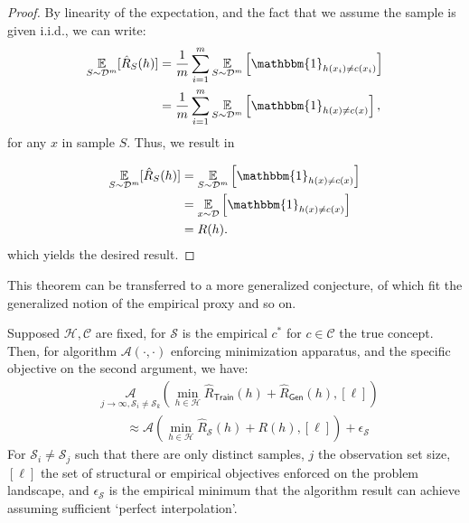 \begin{proof}
    By linearity of the expectation, and the fact that we assume the sample is given i.i.d., we can write: 
\begin{equation}
    \begin{split}
        \underset{S \sim \mathcal{D}^m}{\mathbb{E}}[\hat{R}_S(h)] 
        &= \frac{1}{m} \sum_{i=1}^m 
            \underset{S \sim \mathcal{D}^m}{\mathbb{E}} 
                    \left[ \mathbbm{1}_{h(x_i) \ne c(x_i)} \right] \\
        &= \frac{1}{m} \sum_{i=1}^m 
            \underset{S \sim \mathcal{D}^m}{\mathbb{E}} 
                \left[ \mathbbm{1}_{h(x) \ne c(x)} \right], \\
    \end{split}
\end{equation}
for any \( x \) in sample \( S \). Thus, we result in

\begin{equation}
    \begin{split}
        \underset{S \sim \mathcal{D}^m}{\mathbb{E}}[\hat{R}_S(h)] 
            &= \underset{S \sim \mathcal{D}^m}{\mathbb{E}} 
            \left[ \mathbbm{1}_{h(x) \ne c(x)} \right] \\
            &= \underset{x \sim \mathcal{D}}{\mathbb{E}} 
            \left[ \mathbbm{1}_{h(x) \ne c(x)} \right] \\
            &= R(h).
    \end{split}
\end{equation}
which yields the desired result. 
\end{proof}

This theorem can be transferred to a more generalized conjecture, of which fit the generalized notion of the empirical proxy and so on. 
\begin{conjecture}
    Supposed $\mathcal{H},\mathcal{C}$ are fixed, for $\mathcal{S}$ is the empirical $c^{*}$ for $c\in \mathcal{C}$ the true concept. Then, for algorithm $\mathcal{A}(\cdot,\cdot)$ enforcing minimization apparatus, and the specific objective on the second argument, we have:
    \begin{equation}
        \begin{split}
            &\underset{j\to\infty,\mathcal{S}_{i}\neq\mathcal{S}_{k}}{\mathcal{A}}\left(\min_{h\in\mathcal{H}} \hat{R}_{\mathsf{Train}}(h) + \hat{R}_{\mathsf{Gen}}(h), [\ell]\right)\\
            & \quad \quad \approx \mathcal{A}\left(\min_{h\in\mathcal{H}} \hat{R}_{\mathcal{S}}(h) + R(h), [\ell]\right) + \epsilon_{\mathcal{S}}
        \end{split}
    \end{equation}
    For $\mathcal{S}_{i}\neq\mathcal{S}_{j}$ such that there are only distinct samples, $j$ the observation set size, $[\ell]$ the set of structural or empirical objectives enforced on the problem landscape, and $\epsilon_{\mathcal{S}}$ is the empirical minimum that the algorithm result can achieve assuming sufficient `perfect interpolation'. 
\end{conjecture}

